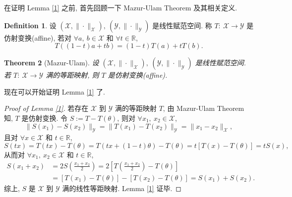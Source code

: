 \documentclass[a4paper,11pt]{article}
\newtheorem{theorem}{Theorem}[section]
\theoremstyle{definition}
\newtheorem{definition}[theorem]{Definition}
\begin{document}
\begin{CJK*}{UTF8}{gbsn}
在证明 Lemma \ref{1} 之前, 首先回顾一下 Mazur-Ulam Theorem 及其相关定义.

\begin{definition}
    设 $ (\mathscr{X}, \| \cdot \|_\mathscr{X}),\ (\mathscr{Y}, \| \cdot \|_\mathscr{Y}) $ 是线性赋范空间.
    称 $ T :\ \mathscr{X} \to \mathscr{Y} $ 是仿射变换(affine), 若对 $ \forall a,\ b \in \mathcal{X} $
    和 $ \forall t \in \mathbb{R} $,
    $$
        T((1 - t) a + t b) = (1 - t) T(a) + t T(b).
    $$
\end{definition}

\begin{theorem}[Mazur-Ulam]
    设 $ (\mathscr{X}, \| \cdot \|_\mathscr{X}),\ (\mathscr{Y}, \| \cdot \|_\mathscr{Y}) $ 是线性赋范空间.
    若 $ T :\ \mathscr{X} \to \mathscr{Y} $ 满的等距映射, 则 $ T $ 是仿射变换(affine).
\end{theorem}

现在可以开始证明 Lemma \ref{1} 了.

\begin{proof}[Proof of Lemma \ref{1}]
    若存在 $ \mathscr{X} $ 到 $ \mathscr{Y} $ 满的等距映射 $ T $, 由 Mazur-Ulam Theorem 知,
    $ T $ 是仿射变换. 令 $ S := T - T(\theta) $, 则对 $ \forall x_1,\ x_2 \in \mathcal{X} $,
    $$
        \| S(x_1) - S(x_2) \|_\mathscr{Y} 
            = \| T(x_1) - T(x_2) \|_\mathscr{Y} 
            = \| x_1 - x_2 \|_\mathscr{X},
    $$
    且对 $ \forall x \in \mathcal{X} $ 和 $ t \in \mathbb{R} $,
    $$
        S(t x) = T(t x) - T(\theta)
                 = T(t x + (1 - t) \theta) - T(\theta)
                 = t[T(x) - T(\theta)]
                 = t S(x),
    $$
    从而对 $ \forall x_1,\ x_2 \in \mathcal{X} $ 和 $ t \in \mathbb{R} $,
    \begin{align*}
        S(x_1 + x_2) &= 2 S \left( \frac{x_1 + x_2}{2} \right) 
                     = 2 \left[ T \left( \frac{x_1 + x_2}{2} \right) - T(\theta) \right] \\
                     &= [T(x_1) - T(\theta)] - [T(x_2) - T(\theta)]
                     = S(x_1) + S(x_2).
    \end{align*}
    综上, $ S $ 是 $ \mathscr{X} $ 到 $ \mathscr{Y} $ 满的线性等距映射. Lemma \ref{1} 证毕.
\end{proof}

\end{CJK*}
\end{document}
